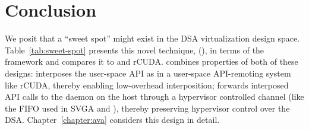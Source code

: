 \section{Conclusion}
We posit that a ``sweet spot'' might exist in
the DSA virtualization design space. Table~\ref{tab:sweet-spot} presents this
novel technique, \hirafull (\hira), in terms of the \iemts framework and
compares it to \Trillium and rCUDA. \hira combines properties of both of these
designs: \hira interposes the user-space API as in a user-space API-remoting
system like rCUDA, thereby enabling low-overhead interposition; \hira forwards
interposed API calls to the daemon on the host through a hypervisor controlled
channel (like the FIFO used in SVGA and \Trillium), thereby preserving
hypervisor control over the DSA. Chapter~\ref{chapter:ava} considers this
design in detail.